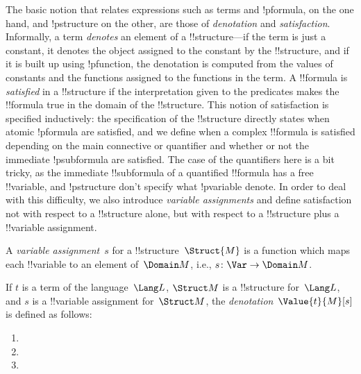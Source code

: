 \documentclass[../../include/open-logic-section]{subfiles}
\begin{document}

\begin{explain}
The basic notion that relates expressions such as terms and
!p{formula}, on the one hand, and !p{structure} on the other, are
those of \emph{denotation} and \emph{satisfaction}.  Informally, a
term \emph{denotes} an element of a !!{structure}---if the term is
just a constant, it denotes the object assigned to the constant by the
!!{structure}, and if it is built up using !p{function}, the
denotation is computed from the values of constants and the functions
assigned to the functions in the term.  A !!{formula} is
\emph{satisfied} in a !!{structure} if the interpretation given to the
predicates makes the !!{formula} true in the domain of the
!!{structure}. This notion of satisfaction is specified inductively:
the specification of the !!{structure} directly states when atomic
!p{formula} are satisfied, and we define when a complex !!{formula} is
satisfied depending on the main connective or quantifier and whether
or not the immediate !p{subformula} are satisfied. The case of the
quantifiers here is a bit tricky, as the immediate !!{subformula} of a
quantified !!{formula} has a free !!{variable}, and !p{structure}
don't specify what !p{variable} denote.  In order to deal with this
difficulty, we also introduce \emph{variable assignments} and define
satisfaction not with respect to a !!{structure} alone, but with
respect to a !!{structure} plus a !!{variable} assignment.
\end{explain}

\begin{defn}
A \emph{variable assignment}~$s$ for a !!{structure}~$\Struct{M}$ is a
function which maps each !!{variable} to an element of~$\Domain M$,
i.e., $s\colon \Var \to \Domain M$.
\end{defn}

\begin{defn}
If $t$ is a term of the language~$\Lang L$, $\Struct M$ is a
!!{structure} for~$\Lang L$, and $s$ is a !!{variable} assignment
for~$\Struct M$, the \emph{denotation}~$\Value{t}{M}[s]$ is defined as
follows:
\begin{enumerate}
\item {}
\item {}
\item {}
\end{enumerate}
\end{defn}
\end{document}
